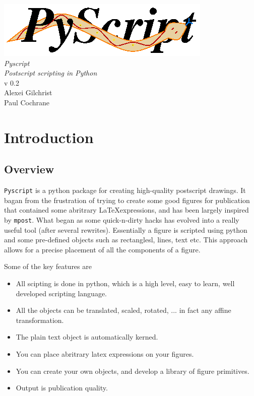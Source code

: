 \documentclass[a4paper]{book}
\begin{document}
\begin{titlepage}
\begin{center}
\vspace*{3cm}
\LARGE

\includegraphics{logo}\\[4cm]

{\Huge \emph{Pyscript}}\\[1cm]
\emph{Postscript scripting in Python}\\[2cm]

v 0.2\\[2cm]

Alexei Gilchrist\\
Paul Cochrane
\end{center}
\end{titlepage}


\tableofcontents

\chapter{Introduction}
\label{cha:introduction}


\section{Overview}

\Verb|Pyscript| is a python package for creating high-quality postscript drawings.
It bagan from the frustration of trying to create some good figures for publication
that contained some abritrary \LaTeX expressions, and has been largely inspired
by \Verb|mpost|. What began as some quick-n-dirty hacks has evolved into a really 
useful tool (after several rewrites). Essentially a figure is scripted using python
and some pre-defined objects such as rectanglesl, lines, text etc. This approach
allows for a precise placement of all the components of a figure.

Some of the key features are
\begin{itemize}
\item All scipting is done in python, which is a high level, easy to
  learn, well developed scripting language.
\item All the objects can be translated, scaled, rotated, ... in fact any affine transformation.
\item The plain text object is automatically kerned.
\item You can place abritrary latex expressions on your figures.
\item You can create your own objects, and develop a library of
  figure primitives. 
\item Output is publication quality.
\end{itemize}
\end{document}
